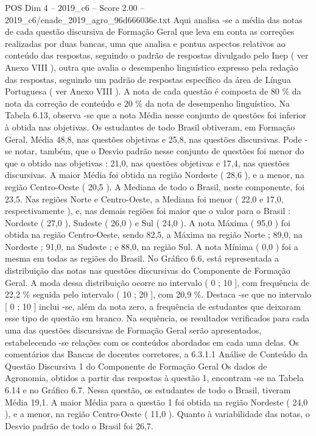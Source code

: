 \begin{textsample}{POS Dim 4 – 2019\_c6 – Score 2.00 – 2019\_c6/enade\_2019\_agro\_96d666036e.txt}
Aqui analisa -se a média das notas de cada questão discursiva de Formação Geral que leva em conta as correções realizadas por duas bancas, uma que analisa e pontua aspectos relativos ao conteúdo das respostas, seguindo o padrão de respostas divulgado pelo Inep ( ver Anexo VIII ), outra que avalia o desempenho linguístico expresso pela redação das respostas, seguindo um padrão de respostas específico da área de Língua Portuguesa ( ver Anexo VIII ).
A nota de cada questão é composta de 80 \% da nota da correção de conteúdo e 20 \% da nota de desempenho linguístico.
Na Tabela 6.13, observa -se que a nota Média nesse conjunto de questões foi inferior à obtida nas objetivas.
Os estudantes de todo Brasil obtiveram, em Formação Geral, Média 48,8, nas questões objetivas e 25,8, nas questões discursivas.
Pode -se notar, também, que o Desvio padrão nesse conjunto de questões foi menor do que o obtido nas objetivas : 21,0, nas questões objetivas e 17,4, nas questões discursivas.
A maior Média foi obtida na região Nordeste ( 28,6 ), e a menor, na região Centro-Oeste ( 20,5 ).
A Mediana de todo o Brasil, neste componente, foi 23,5.
Nas regiões Norte e Centro-Oeste, a Mediana foi menor ( 22,0 e 17,0, respectivamente ), e, nas demais regiões foi maior que o valor para o Brasil : Nordeste ( 27,0 ), Sudeste ( 26,0 ) e Sul ( 24,0 ).
A nota Máxima ( 95,0 ) foi obtida na região Centro-Oeste, sendo 82,5, a Máxima na região Norte ; 89,0, na Nordeste ; 91,0, na Sudeste ; e 88,0, na região Sul.
A nota Mínima ( 0,0 ) foi a mesma em todas as regiões do Brasil.
No Gráfico 6.6, está representada a distribuição das notas nas questões discursivas do Componente de Formação Geral.
A moda dessa distribuição ocorre no intervalo ( 0 ; 10 ], com frequência de 22,2 \% seguida pelo intervalo ( 10 ; 20 ], com 20,9 \%.
Destaca -se que no intervalo [ 0 ; 10 ] inclui -se, além da nota zero, a frequência de estudantes que deixaram esse tipo de questão em branco.
Na sequência, os resultados verificados para cada uma das questões discursivas de Formação Geral serão apresentados, estabelecendo -se relações com os conteúdos abordados em cada uma delas.
Os comentários das Bancas de docentes corretores, a 6.3.1.1 Análise de Conteúdo da Questão Discursiva 1 do Componente de Formação Geral Os dados de Agronomia, obtidos a partir das respostas à questão 1, encontram -se na Tabela 6.14 e no Gráfico 6.7.
Nessa questão, os estudantes de todo o Brasil, tiveram Média 19,1.
A maior Média para a questão 1 foi obtida na região Nordeste ( 24,0 ), e a menor, na região Centro-Oeste ( 11,0 ).
Quanto à variabilidade das notas, o Desvio padrão de todo o Brasil foi 26,7.

\end{textsample}
